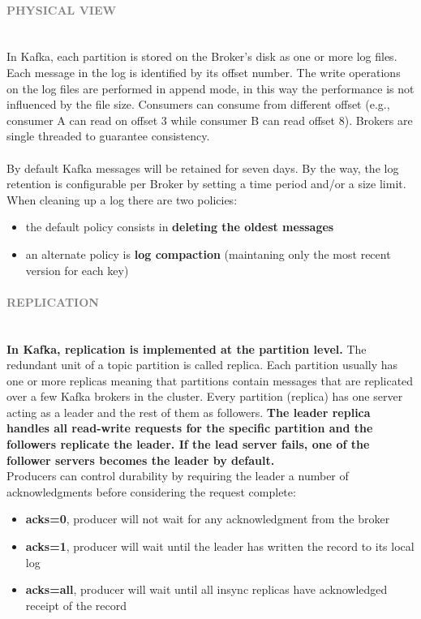 \documentclass[10pt,a4paper]{article}
\newcommand{\nline}{\\~\\}
\newcommand{\myparagraph}[1]{\paragraph{\normalsize{\textcolor{gray}{\uppercase{\textbf{#1}}}} }\mbox{} \vspace{0.5em}\\}
\begin{document}
\myparagraph{Physical View}
In Kafka, each partition is stored on the Broker’s disk as one or more log files. Each message in the log is identified by its offset number. The write operations on the log files are performed in append mode, in this way the performance is not influenced by the file size.
Consumers can consume from different offset (e.g., consumer A can read on offset 3 while consumer B can read offset 8). Brokers are single threaded to guarantee consistency.
\nline
By default Kafka messages will be retained for seven days. By the way, the log retention is configurable per Broker by setting a time period and/or a size limit. 
When cleaning up a log there are two policies:
\begin{itemize}
	\item the default policy consists in \textbf{deleting the oldest messages}
	\item an alternate policy is \textbf{log compaction} (maintaning only the most recent version for each key)
\end{itemize}

\myparagraph{Replication}
\textbf{In Kafka, replication is implemented at the partition level.} The redundant unit of a topic partition is called replica. Each partition usually has one or more replicas meaning that partitions contain messages that are replicated over a few Kafka brokers in the cluster. 	Every partition (replica) has one server acting as a leader and the rest of them as followers. \textbf{The leader replica handles all read-write requests for the specific partition and the followers replicate the leader. If the lead server fails, one of the follower servers becomes the leader by default.}  \\
Producers can control durability by requiring the leader a number of acknowledgments before considering the request complete:
\begin{itemize}
	\item \textbf{acks=0}, producer will not wait for any acknowledgment from the broker
	\item \textbf{acks=1}, producer will wait until the leader has written the record to its local log
	\item \textbf{acks=all}, producer will wait until all insync replicas have acknowledged receipt of the record
\end{itemize}
\end{document}
